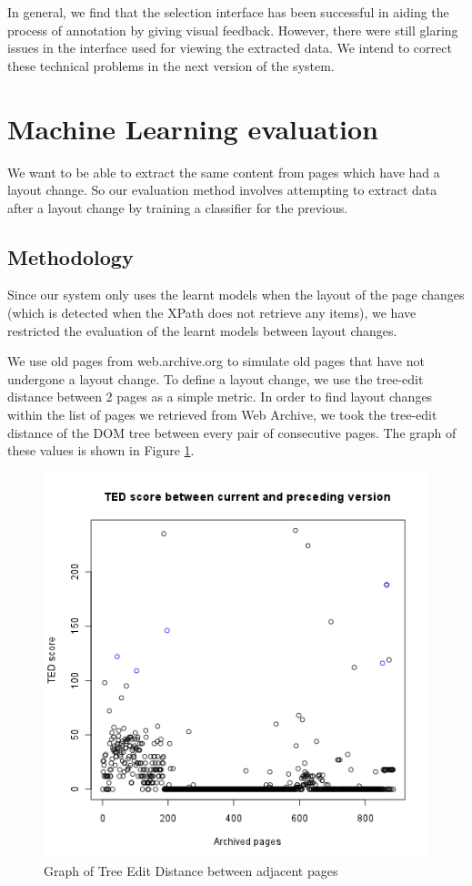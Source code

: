 In general, we find that the selection interface has been successful in aiding
the process of annotation by giving visual feedback. However, there were still
glaring issues in the interface used for viewing the extracted data. We intend to
correct these technical problems in the next version of the system.

\section{Machine Learning evaluation}
 We want to be able to extract the same content from pages which have had a layout change. So our
 evaluation method involves attempting to extract data after a layout change by training a
 classifier for the previous.
\subsection{Methodology}
	Since our system only uses the learnt models when the layout of the page changes (which is 
detected when the XPath does not retrieve any items), we have restricted the evaluation of 
the learnt models between layout changes.

	We use old pages from web.archive.org to simulate old pages that have not
undergone a layout change. To define a layout change, we use the tree-edit distance \cite{Zhang1989} between 2 pages as
a simple metric. In order to find layout changes within the list of pages we retrieved from Web
Archive, we took the tree-edit distance of the DOM tree between every pair of consecutive pages.
The graph of these values is shown in Figure \ref{fig:scoregraph}.

\begin{figure}[htbp]
\centering
\includegraphics[scale=0.6]{scoregraph.png} 
\caption{Graph of Tree Edit Distance between adjacent pages}
\label{fig:scoregraph}
\end{figure}

